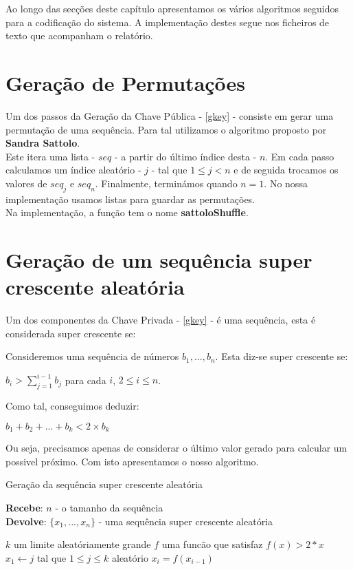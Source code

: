 \documentclass[11pt, language=portuguese]{report}
\begin{document}
Ao longo das secções deste capítulo apresentamos os vários algoritmos seguidos para a codificação do sistema.
A implementação destes segue nos ficheiros de texto que acompanham o relatório.

\section{Geração de Permutações}
\label{perm}

Um dos passos da Geração da Chave Pública - \ref{gkey} - consiste em gerar uma permutação de uma sequência. Para tal utilizamos o algoritmo proposto por \textbf{Sandra Sattolo}\autocite{sattolo}.\\
Este itera uma lista - $seq$ - a partir do último índice desta - $n$. Em cada passo calculamos um índice aleatório - $j$ - tal que $1 \le j < n$ e de seguida trocamos os valores de $seq_j$ e $seq_n$. Finalmente, terminámos quando $n = 1$. No nossa implementação usamos listas para guardar as permutações.\\
Na implementação, a função tem o nome \textbf{sattoloShuffle}.

\section{Geração de um sequência super crescente aleatória}
\label{seq}

Um dos componentes da Chave Privada - \ref{gkey} - é uma sequência, esta é considerada super crescente se:\\
\begin{definition}
	Consideremos uma sequência de números ${b_1, ..., b_n}$. Esta diz-se super crescente se:
	\begin{center}
		$b_i > \sum_{j = 1}^{i - 1} b_j$ para cada $i$, $2 \le i \le n$. 
	\end{center}
\end{definition}

Como tal, conseguimos deduzir:

\begin{center}
	$b_1 + b_2 + ... + b_k < 2 \times b_k$
\end{center}

Ou seja, precisamos apenas de considerar o último valor gerado para calcular um possivel próximo.
Com isto apresentamos o nosso algoritmo.
\begin{algorithm}[H]
	\caption{Geração da sequência super crescente aleatória}
	\textbf{Recebe}: $n$ - o tamanho da sequência\\
	\textbf{Devolve}: $\{x_1, ..., x_n\}$ - uma sequência super crescente aleatória
	\begin{algorithmic}[1]
		\State $k$ um limite aleatóriamente grande
		\State $f$ uma funcão que satisfaz $f(x) > 2 * x$
		\State $x_1 \gets j$ tal que $1 \le j \le k$ aleatório
			\State $x_i = f(x_{i-1})$
		\EndFor
	\end{algorithmic}
\end{algorithm}
\end{document}
